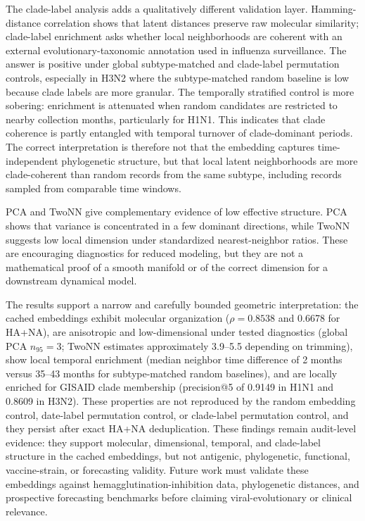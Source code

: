 \documentclass[11pt]{article}
\begin{document}
The clade-label analysis adds a qualitatively different validation layer. Hamming-distance correlation shows that latent distances preserve raw molecular similarity; clade-label enrichment asks whether local neighborhoods are coherent with an external evolutionary-taxonomic annotation used in influenza surveillance. The answer is positive under global subtype-matched and clade-label permutation controls, especially in H3N2 where the subtype-matched random baseline is low because clade labels are more granular. The temporally stratified control is more sobering: enrichment is attenuated when random candidates are restricted to nearby collection months, particularly for H1N1. This indicates that clade coherence is partly entangled with temporal turnover of clade-dominant periods. The correct interpretation is therefore not that the embedding captures time-independent phylogenetic structure, but that local latent neighborhoods are more clade-coherent than random records from the same subtype, including records sampled from comparable time windows.

PCA and TwoNN give complementary evidence of low effective structure. PCA shows that variance is concentrated in a few dominant directions, while TwoNN suggests low local dimension under standardized nearest-neighbor ratios. These are encouraging diagnostics for reduced modeling, but they are not a mathematical proof of a smooth manifold or of the correct dimension for a downstream dynamical model.

The results support a narrow and carefully bounded geometric interpretation: the cached embeddings exhibit molecular organization ($\rho=0.8538$ and 0.6678 for HA+NA), are anisotropic and low-dimensional under tested diagnostics (global PCA $n_{95}=3$; TwoNN estimates approximately 3.9--5.5 depending on trimming), show local temporal enrichment (median neighbor time difference of 2 months versus 35--43 months for subtype-matched random baselines), and are locally enriched for GISAID clade membership (precision@5 of 0.9149 in H1N1 and 0.8609 in H3N2). These properties are not reproduced by the random embedding control, date-label permutation control, or clade-label permutation control, and they persist after exact HA+NA deduplication. These findings remain audit-level evidence: they support molecular, dimensional, temporal, and clade-label structure in the cached embeddings, but not antigenic, phylogenetic, functional, vaccine-strain, or forecasting validity. Future work must validate these embeddings against hemagglutination-inhibition data, phylogenetic distances, and prospective forecasting benchmarks before claiming viral-evolutionary or clinical relevance.
\end{document}
